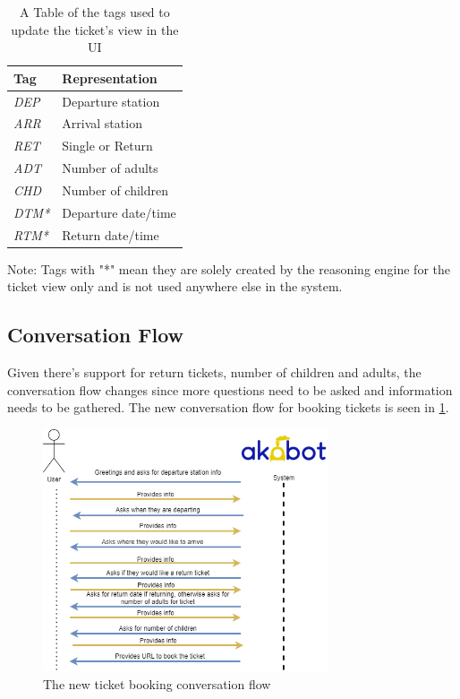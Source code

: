 \documentclass[11pt]{article}
\begin{document}
        \begin{table}[!ht]
\centering
\begin{tabular}{|l|l|}
\hline
\textbf{Tag} & \textbf{Representation} \\ \hline
\textit{DEP} & Departure station       \\ \hline
\textit{ARR} & Arrival station         \\ \hline
\textit{RET} & Single or Return        \\ \hline
\textit{ADT} & Number of adults        \\ \hline
\textit{CHD} & Number of children      \\ \hline
\textit{DTM*} & Departure date/time     \\ \hline
\textit{RTM*} & Return date/time        \\ \hline
\end{tabular}
\caption{A Table of the tags used to update the ticket's view in the UI}
Note: Tags with "*" mean they are solely created by the reasoning engine for the ticket view only and is not used anywhere else in the system.
\label{tab:TicketTags}
\end{table}

\newpage

    \subsection{Conversation Flow}
    Given there's support for return tickets, number of children and adults, the conversation flow changes since more questions need to be asked and information needs to be gathered. The new conversation flow for booking tickets is seen in \cref{fig:newbookingflow}.
    
    \begin{figure}[!ht]
        \centering
        \includegraphics[width=0.75\textwidth]{NewBookingFlow.png}
        \caption{The new ticket booking conversation flow}
        \label{fig:newbookingflow}
    \end{figure}
\end{document}
